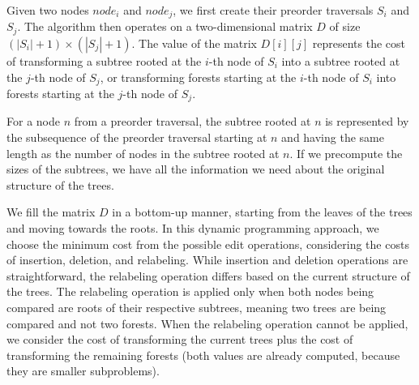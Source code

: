 Given two nodes $node_i$ and $node_j$, we first create their preorder traversals $S_i$ and $S_j$.
The algorithm then operates on a two-dimensional matrix $D$ of size $(|S_i| + 1) \times (|S_j| + 1)$.
The value of the matrix $D[i][j]$ represents the cost of transforming a subtree rooted at the $i$-th node of $S_i$ into a subtree rooted at the $j$-th node of $S_j$, or transforming forests starting at the $i$-th node of $S_i$ into forests starting at the $j$-th node of $S_j$.

For a node $n$ from a preorder traversal, the subtree rooted at $n$ is represented by the subsequence of the preorder traversal starting at $n$ and having the same length as the number of nodes in the subtree rooted at $n$.
If we precompute the sizes of the subtrees, we have all the information we need about the original structure of the trees.

We fill the matrix $D$ in a bottom-up manner, starting from the leaves of the trees and moving towards the roots.
In this dynamic programming approach, we choose the minimum cost from the possible edit operations, considering the costs of insertion, deletion, and relabeling.
While insertion and deletion operations are straightforward, the relabeling operation differs based on the current structure of the trees.
The relabeling operation is applied only when both nodes being compared are roots of their respective subtrees, meaning two trees are being compared and not two forests.
When the relabeling operation cannot be applied, we consider the cost of transforming the current trees plus the cost of transforming the remaining forests (both values are already computed, because they are smaller subproblems).

